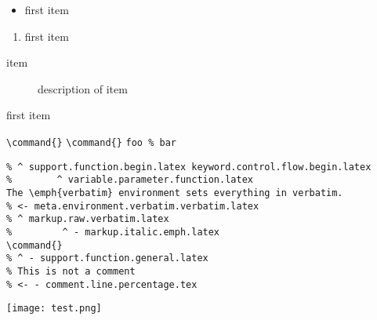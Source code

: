 \documentclass[12pt]{article}
\begin{document}

\begin{itemize}
\item first item
\end{itemize}

\begin{enumerate}
\item first item
\end{enumerate}

\begin{description}
\item[item] description of item
\end{description}

\begin{list}{()}{}
\item first item
\end{list}


\command{}
\verb|\command{}|
\verb+\command{}+
\verb|foo % bar|


\begin{verbatim}
% ^ support.function.begin.latex keyword.control.flow.begin.latex
%        ^ variable.parameter.function.latex
The \emph{verbatim} environment sets everything in verbatim.
% <- meta.environment.verbatim.verbatim.latex
% ^ markup.raw.verbatim.latex
%         ^ - markup.italic.emph.latex
\command{}
% ^ - support.function.general.latex
% This is not a comment
% <- - comment.line.percentage.tex
\end{verbatim}




\texttt{[image: test.png]}
\end{document}
